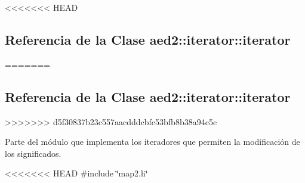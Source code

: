 <<<<<<< HEAD
\hypertarget{classaed2_1_1iterator_1_1iterator}{\subsection{\-Referencia de la \-Clase aed2\-:\-:iterator\-:\-:iterator}
\label{classaed2_1_1iterator_1_1iterator}
}
=======
\hypertarget{classaed2_1_1iterator_1_1iterator}{}\subsection{Referencia de la Clase aed2\+:\+:iterator\+:\+:iterator}
\label{classaed2_1_1iterator_1_1iterator}
>>>>>>> d5f30837b23c557aacdddcbfc53bfb8b38a94c5c


Parte del módulo que implementa los iteradores que permiten la modificación de los significados.  




<<<<<<< HEAD
{\ttfamily \#include \char`\"{}map2.\-h\char`\"{}}

